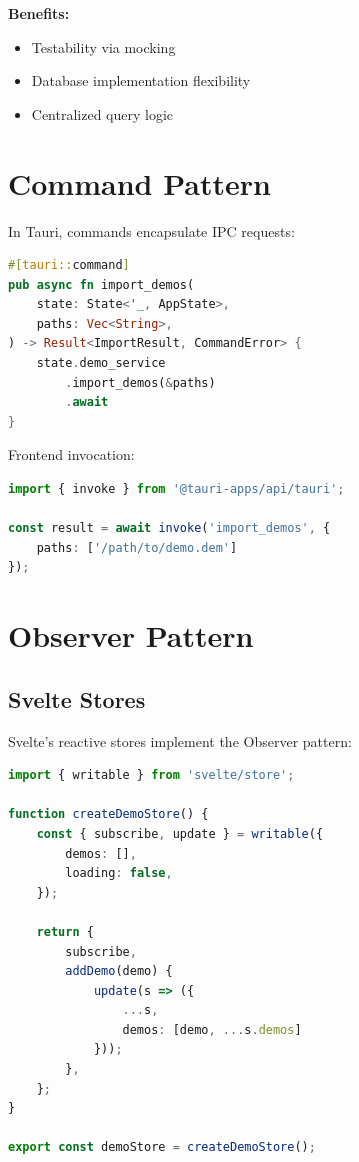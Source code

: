 \textbf{Benefits:}
\begin{itemize}
    \item Testability via mocking
    \item Database implementation flexibility
    \item Centralized query logic
\end{itemize}

\section{Command Pattern}

In Tauri, commands encapsulate IPC requests:

\begin{lstlisting}[language=Rust]
#[tauri::command]
pub async fn import_demos(
    state: State<'_, AppState>,
    paths: Vec<String>,
) -> Result<ImportResult, CommandError> {
    state.demo_service
        .import_demos(&paths)
        .await
}
\end{lstlisting}

Frontend invocation:

\begin{lstlisting}[language=TypeScript]
import { invoke } from '@tauri-apps/api/tauri';

const result = await invoke('import_demos', { 
    paths: ['/path/to/demo.dem'] 
});
\end{lstlisting}

\section{Observer Pattern}

\subsection{Svelte Stores}

Svelte's reactive stores implement the Observer pattern:

\begin{lstlisting}[language=TypeScript]
import { writable } from 'svelte/store';

function createDemoStore() {
    const { subscribe, update } = writable({
        demos: [],
        loading: false,
    });

    return {
        subscribe,
        addDemo(demo) {
            update(s => ({
                ...s,
                demos: [demo, ...s.demos]
            }));
        },
    };
}

export const demoStore = createDemoStore();
\end{lstlisting}

